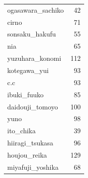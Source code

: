 \documentclass[11.5pt]{article}
\begin{document}
\begin{supertabular}[h!]{lr}
        ogasawara\_sachiko & 42 \\
        cirno & 71 \\
        sonsaku\_hakufu & 55 \\
        nia & 65 \\
        yuzuhara\_konomi & 112 \\
        kotegawa\_yui & 93 \\
        c.c & 93 \\
        ibuki\_fuuko & 85 \\
        daidouji\_tomoyo & 100 \\
        yuno & 98 \\
        ito\_chika & 39 \\
        hiiragi\_tsukasa & 96 \\
        houjou\_reika & 129 \\
        miyafuji\_yoshika & 68 \\
    \end{supertabular}
\end{document}
